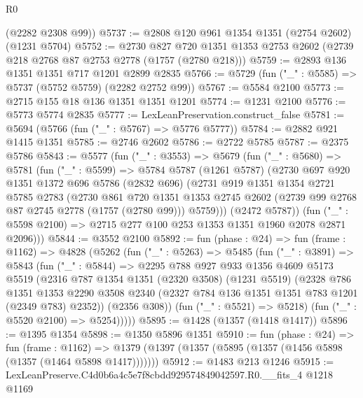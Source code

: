 \begin{lexlean}{R0}
\begin{coremodule}
      (@2282 @2308 @99))
@5737 := @2808 @120 @961 @1354 @1351 (@2754 @2602) (@1231 @5704)
@5752 := @2730
    @827
    @720
    @1351
    @1353
    @2753
    @2602
    (@2739 @218 @2768 @87 @2753 @2778 (@1757 (@2780 @218)))
@5759 := @2893 @136 @1351 @1351 @717 @1201 @2899 @2835
@5766 := @5729 (fun ("_" : @5585) => @5737 (@5752 @5759) (@2282 @2752 @99))
@5767 := @5584 @2100
@5773 := @2715 @155 @18 @136 @1351 @1351 @1201
@5774 := @1231 @2100
@5776 := @5773 @5774 @2835
@5777 := LexLeanPreservation.construct_false
@5781 := @5694 (@5766 (fun ("_" : @5767) => @5776 @5777))
@5784 := @2882 @921 @1415 @1351
@5785 := @2746 @2602
@5786 := @2722 @5785
@5787 := @2375 @5786
@5843 := @5577
    (fun ("_" : @3553) =>
    @5679
      (fun ("_" : @5680) =>
      @5781
        (fun ("_" : @5599) =>
        @5784
          @5787
          (@1261 @5787)
          (@2730
            @697
            @920
            @1351
            @1372
            @696
            @5786
            (@2832 @696)
            (@2731
              @919
              @1351
              @1354
              @2721
              @5785
              @2783
              (@2730
                @861
                @720
                @1351
                @1353
                @2745
                @2602
                (@2739 @99 @2768 @87 @2745 @2778 (@1757 (@2780 @99)))
                @5759)))
          (@2472 @5787))
        (fun ("_" : @5598 @2100) => @2715 @277 @100 @253 @1353 @1351 @1960 @2078 @2871 @2096)))
@5844 := @3552 @2100
@5892 := fun (phase : @24) =>
  fun (frame : @1162) =>
  @4828
    (@5262
      (fun ("_" : @5263) =>
      @5485
        (fun ("_" : @3891) =>
        @5843
          (fun ("_" : @5844) =>
          @2295
            @788
            @927
            @933
            @1356
            @4609
            @5173
            @5519
            (@2316
              @787
              @1354
              @1351
              (@2320 @3508)
              (@1231 @5519)
              (@2328
                @786
                @1351
                @1353
                @2290
                @3508
                @2340
                (@2327 @784 @136 @1351 @1351 @783 @1201 (@2349 @783) @2352))
              (@2356 @308))
            (fun ("_" : @5521) => @5218)
            (fun ("_" : @5520 @2100) => @5254)))))
@5895 := @1428 (@1357 (@1418 @1417))
@5896 := @1395 @1354
@5898 := @1350 @5896 @1351
@5910 := fun (phase : @24) =>
  fun (frame : @1162) =>
  @1379 (@1397 (@1357 (@5895 (@1357 (@1456 @5898 (@1357 (@1464 @5898 @1417)))))))
@5912 := @1483 @213 @1246
@5915 := LexLeanPreserve.C4d0b6a4c5e7f8cbdd929574849042597.R0.__fits_4 @1218 @1169

\end{coremodule}
\end{lexlean}
